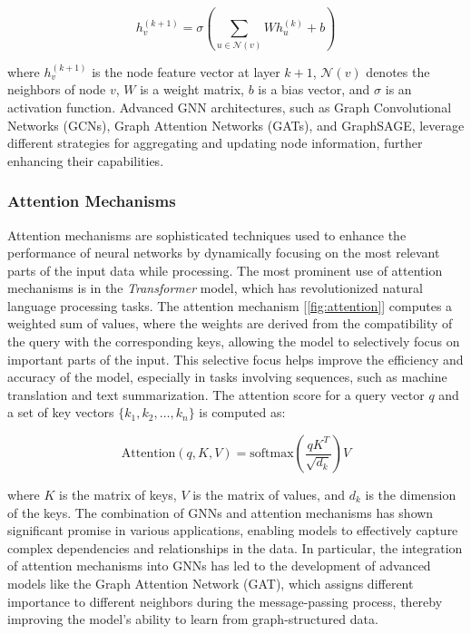 \documentclass[../Thesis.tex]{subfiles}
\begin{document}
	\[
	h_v^{(k+1)} = \sigma \left( \sum_{u \in \mathcal{N}(v)} W h_u^{(k)} + b \right)
	\]
	
	where \(h_v^{(k+1)}\) is the node feature vector at layer \(k+1\), \(\mathcal{N}(v)\) denotes the neighbors of node \(v\), \(W\) is a weight matrix, \(b\) is a bias vector, and \(\sigma\) is an activation function. Advanced GNN architectures, such as Graph Convolutional Networks (GCNs), Graph Attention Networks (GATs), and GraphSAGE, leverage different strategies for aggregating and updating node information, further enhancing their capabilities.
	
	
	
	\subsubsection{Attention Mechanisms}
	Attention mechanisms are sophisticated techniques used to enhance the performance of neural networks by dynamically focusing on the most relevant parts of the input data while processing. The most prominent use of attention mechanisms is in the \emph{Transformer} model, which has revolutionized natural language processing tasks. The attention mechanism [\autoref{fig:attention}] computes a weighted sum of values, where the weights are derived from the compatibility of the query with the corresponding keys, allowing the model to selectively focus on important parts of the input. This selective focus helps improve the efficiency and accuracy of the model, especially in tasks involving sequences, such as machine translation and text summarization. The attention score for a query vector \(q\) and a set of key vectors \(\{k_1, k_2, \ldots, k_n\}\) is computed as:
	
	\[
	\text{Attention}(q, K, V) = \text{softmax} \left( \frac{qK^T}{\sqrt{d_k}} \right) V
	\]
	
	where \(K\) is the matrix of keys, \(V\) is the matrix of values, and \(d_k\) is the dimension of the keys. The combination of GNNs and attention mechanisms has shown significant promise in various applications, enabling models to effectively capture complex dependencies and relationships in the data. In particular, the integration of attention mechanisms into GNNs has led to the development of advanced models like the Graph Attention Network (GAT), which assigns different importance to different neighbors during the message-passing process, thereby improving the model's ability to learn from graph-structured data.
	
	
	
\end{document}
